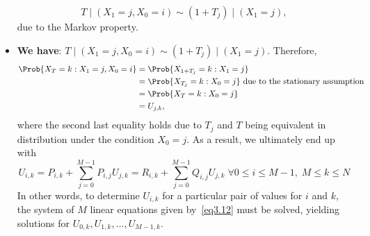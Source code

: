 \begin{itemize}
          \[ T\mid(X_1=j,X_0=i)\sim (1+T_j)\mid(X_1=j), \]
          due to the Markov property.
    \item \textbf{We have}: $ T\mid(X_1=j,X_0=i)\sim (1+T_j)\mid(X_1=j) $. Therefore,
          \begin{align*}
              \Prob{X_{T}=k \given X_{1}=j, X_{0}=i}
               & =\Prob{X_{1+T_{j}}=k \given X_{1}=j}                                         \\
               & =\Prob{X_{T_{j}}=k \given X_{0}=j} \text{ due to the stationary assumption } \\
               & =\Prob{X_{T}=k \given X_{0}=j}                                               \\
               & =U_{j, k},
          \end{align*}
          where the second last equality holds due to $ T_j $ and $ T $ being equivalent in distribution under
          the condition $ X_0=j $. As a result, we ultimately end up with
          \[ U_{i, k}=P_{i, k}+\sum_{j=0}^{M-1} P_{i, j} U_{j, k}=R_{i, k}+\sum_{j=0}^{M-1} Q_{i, j} U_{j, k}\; \forall 0 \leq i \leq M-1,\; M \leq k \leq N\label{eq3.12}\tag*{(3.12)} \]
          In other words, to determine $U_{i, k}$ for a particular pair of values for $i$ and $k$, the system of $M$
          linear equations given by~\ref{eq3.12} must be solved, yielding solutions for $U_{0, k}, U_{1, k}, \ldots, U_{M-1, k}$.
\end{itemize}
